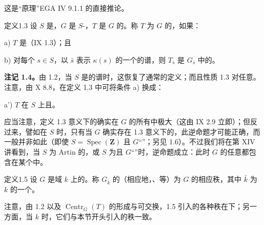 这是“原理”EGA IV 9.1.1 的直接推论。
\begin{SGAresult}{定义}{1.3}
设 $S$ 是，$G$ 是 $S$-，$T$ 是 $G$ 的。称 $T$ 为 $G$ 的，如果：

 a) $T$ 是（IX 1.3）；且

 b) 对每个 $s\in S$，以 $\bar s$ 表示 $\kappa(s)$ 的一个的谱，则 $T_{\bar s}$ 是 $G_{\bar s}$ 中的。
\end{SGAresult}
\textbf{注记 1.4。}由 1.2，当 $S$ 是的谱时，这恢复了通常的定义；而且性质 1.3 对任意。注意，由 X 8.8，在定义 1.3 中可将条件 a) 换成：

 a') $T$ 在 $S$ 上且。

应当注意，定义 1.3 意义下的确实在 $G$ 的所有中极大（这由 IX 2.9 立即）；但反过来，譬如在 $S$ 时，只有当 $G$ 确实存在 1.3 意义下的，此逆命题才可能正确，而一般并非如此（即使 $S=\operatorname{Spec}(\mathbf Z)$ 且 $G$“”；另见 1.6）。不过我们将在第 XIV 讲看到，当 $S$ 为 Artin 的，或 $S$ 为且 $G$“”时，逆命题成立：此时 $G$ 的任意都包含在某个中。
\begin{SGAresult}{定义}{1.5}
设 $G$ 是域 $k$ 上的。称 $G_{\bar k}$ 的（相应地，、等）为 $G$ 的相应秩，其中 $\bar k$ 为 $k$ 的一个。
\end{SGAresult}
注意，由 1.2 以及 $\operatorname{Centr}_G(T)$ 的形成与可交换，1.5 引入的各种秩在下；另一方面，当 $k$ 时，它们与本节开头引入的秩一致。

